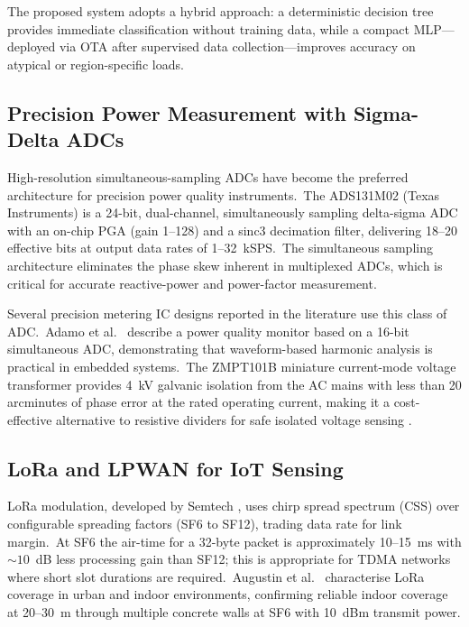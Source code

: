 \documentclass[conference]{IEEEtran}
\begin{document}
The proposed system adopts a hybrid approach: a deterministic
decision tree provides immediate classification without training data,
while a compact MLP---deployed via OTA after supervised data
collection---improves accuracy on atypical or region-specific loads.

\subsection{Precision Power Measurement with Sigma-Delta ADCs}

High-resolution simultaneous-sampling ADCs have become the preferred
architecture for precision power quality instruments.\ The ADS131M02
(Texas Instruments) \cite{ti_ads131m02_ds} is a 24-bit, dual-channel,
simultaneously sampling delta-sigma ADC with an on-chip PGA (gain
1--128) and a sinc3 decimation filter, delivering 18--20 effective
bits at output data rates of 1--32~kSPS.\ The simultaneous sampling
architecture eliminates the phase skew inherent in multiplexed ADCs,
which is critical for accurate reactive-power and power-factor
measurement.

Several precision metering IC designs reported in the literature use
this class of ADC.\ Adamo et al.\ \cite{adamo_power_quality_2011}
describe a power quality monitor based on a 16-bit simultaneous ADC,
demonstrating that waveform-based harmonic analysis is practical in
embedded systems.\ The ZMPT101B miniature current-mode voltage
transformer provides 4~kV galvanic isolation from the AC mains with
less than 20 arcminutes of phase error at the rated operating current,
making it a cost-effective alternative to resistive dividers for safe
isolated voltage sensing \cite{zmpt101b_datasheet}.

\subsection{LoRa and LPWAN for IoT Sensing}

LoRa modulation, developed by Semtech \cite{semtech_sx1278_ds}, uses
chirp spread spectrum (CSS) over configurable spreading factors (SF6
to SF12), trading data rate for link margin.\ At SF6 the air-time
for a 32-byte packet is approximately 10--15~ms with \(\sim 10\)~dB
less processing gain than SF12; this is appropriate for TDMA
networks where short slot durations are required.\ Augustin et al.\
\cite{augustin_lora_sensors_2016} characterise LoRa coverage in urban
and indoor environments, confirming reliable indoor coverage at 20--30~m
through multiple concrete walls at SF6 with 10~dBm transmit power.
\end{document}
